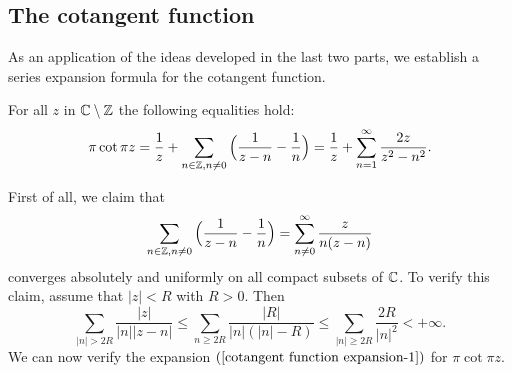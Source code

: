 \subsection{The cotangent function}
As an application of the ideas developed in the last two parts, we establish a series expansion formula for the cotangent function.
\begin{theorem}\label{cotangent function expansion}
For all $z$ in $\mathbb{C}\setminus\mathbb{Z}$ the following equalities hold:
\begin{align}\label{cotangent function expansion-1}
\pi\cot\pi z=\frac{1}{z}+\sum_{n\in\mathbb{Z},n\neq 0}\Big(\frac{1}{z-n}-\frac{1}{n}\Big)=\frac{1}{z}+\sum_{n=1}^{\infty}\frac{2z}{z^2-n^2}.
\end{align}
\end{theorem}
First of all, we claim that
\[\sum_{n\in\mathbb{Z},n\neq 0}\Big(\frac{1}{z-n}-\frac{1}{n}\Big)=\sum_{n\neq 0}^{\infty}\frac{z}{n(z-n)}\]
converges absolutely and uniformly on all compact subsets of $\mathbb{C}$. To verify this claim, assume that $|z|<R$ with $R>0$. Then
\[\sum_{|n|>2R}\frac{|z|}{|n||z-n|}\leq\sum_{n\geq 2R}\frac{|R|}{|n|(|n|-R)}\leq\sum_{|n|\geq 2R}\frac{2R}{|n|^2}<+\infty.\]
We can now verify the expansion $(\ref{cotangent function expansion-1})$ for $\pi\cot\pi z$.
